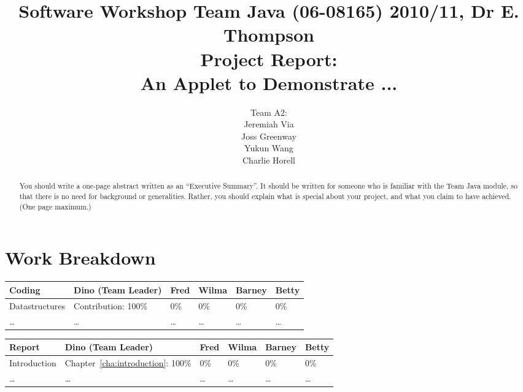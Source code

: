 \documentclass[10pt]{report}
\title{%
  {\normalsize Software Workshop Team Java (06-08165) 2010/11, Dr E. Thompson }\\[2cm]
  Project Report:\\
  An Applet to Demonstrate ...}
\author{Team A2:  \\
  Jeremiah Via \\
  Joss Greenway \\
  Yukun Wang \\
  Charlie Horell
}
\begin{document}
\maketitle
\chapter*{Work Breakdown}
\label{work-breakdown}

\thispagestyle{empty}


{\small
  \noindent\begin{tabular}{|l||l|l|l|l|l|}\hline
    \textbf{Coding} & \textbf{Dino (Team Leader)} & \textbf{Fred} & \textbf{Wilma} & \textbf{Barney} & \textbf{Betty} \\ \hline\hline
    Datastructures  & Contribution: 100\%         & 0\%           & 0\%            & 0\%             & 0\%            \\ \hline
    \ldots          & \ldots                      & \ldots        & \ldots         & \ldots          & \ldots         \\ \hline
  \end{tabular}\vspace*{1cm}

  \noindent\begin{tabular}{|l||l|l|l|l|l|}\hline
    \textbf{Report} & \textbf{Dino (Team Leader)}           & \textbf{Fred} & \textbf{Wilma} & \textbf{Barney} & \textbf{Betty} \\ \hline\hline
    Introduction    & Chapter~\ref{cha:introduction}: 100\% & 0\%           & 0\%            & 0\%             & 0\%            \\ \hline
    \ldots          & \ldots                                & \ldots        & \ldots         & \ldots          & \ldots         \\ \hline
  \end{tabular}
}

\tableofcontents
\thispagestyle{empty}

\begin{abstract}
  You should write a one-page abstract written as an ``Executive Summary''. It
  should be written for someone who is familiar with the Team Java module, so
  that there is no need for background or generalities. Rather, you should
  explain what is special about your project, and what you claim to have
  achieved. (One page maximum.)
\end{abstract}







\end{document}
